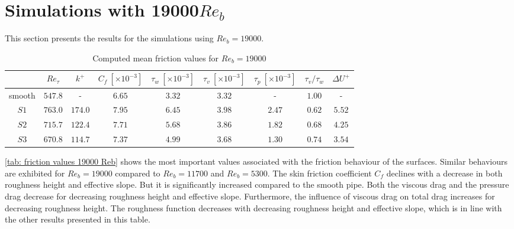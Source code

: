 \newpage
\section{Simulations with 19000$Re_b$}\label{sec: results 19000 Reb}

This section presents the results for the simulations using $Re_b = 19000$.

\begin{table}[h]
    \centering
    \caption[Mean friction values for $Re_b = 19000$]{Computed mean friction values for $Re_b = 19000$}
    \begin{tabular}{c c c c c c c c c}
        \toprule
                & $Re_\tau$ & $k^+$     & $C_f\ [\times10^{-3}]$    & $\tau_w\ [\times10^{-3}]$    & $\tau_v\ [\times10^{-3}]$ & $\tau_p\ [\times10^{-3}]$ & $\tau_v/\tau_w$   & $\Delta U^+$\\
        \midrule
        smooth  & $547.8$   & -         & $6.65$                    & $3.32$                        & $3.32$                    & -                         & $1.00$            & - \\
        $S1$    & $763.0$   & $174.0$   & $7.95$                    & $6.45$                        & $3.98$                    & $2.47$                    & $0.62$            & $5.52$\\
        $S2$    & $715.7$   & $122.4$   & $7.71$                    & $5.68$                        & $3.86$                    & $1.82$                    & $0.68$            & $4.25$\\
        $S3$    & $670.8$   & $114.7$   & $7.37$                    & $4.99$                        & $3.68$                    & $1.30$                    & $0.74$            & $3.54$\\
        \bottomrule
    \end{tabular}
    \label{tab: friction values 19000 Reb}
\end{table}
\autoref{tab: friction values 19000 Reb} shows the most important values associated with the friction behaviour of the surfaces.
Similar behaviours are exhibited for $Re_b = 19000$ compared to $Re_b = 11700$ and $Re_b = 5300$.
The skin friction coefficient $C_f$ declines with a decrease in both roughness height and effective slope.
But it is significantly increased compared to the smooth pipe.
Both the viscous drag and the pressure drag decrease for decreasing roughness height and effective slope.
Furthermore, the influence of viscous drag on total drag increases for decreasing roughness height.
The roughness function decreases with decreasing roughness height and effective slope, which is in line with the other results presented in this table.

